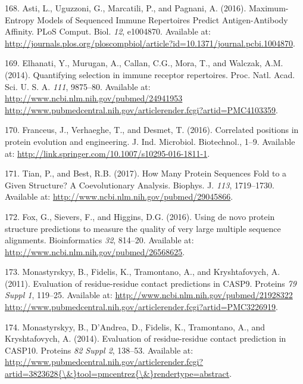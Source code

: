 \documentclass[11pt,a4paper,twoside]{book}
\theoremstyle{definition}
\theoremstyle{definition}
\theoremstyle{remark}
\begin{document}
\hypertarget{ref-Asti2016}{}
168. Asti, L., Uguzzoni, G., Marcatili, P., and Pagnani, A. (2016).
Maximum-Entropy Models of Sequenced Immune Repertoires Predict
Antigen-Antibody Affinity. PLoS Comput. Biol. \emph{12}, e1004870.
Available at:
\url{http://journals.plos.org/ploscompbiol/article?id=10.1371/journal.pcbi.1004870}.

\hypertarget{ref-Elhanati2014}{}
169. Elhanati, Y., Murugan, A., Callan, C.G., Mora, T., and Walczak,
A.M. (2014). Quantifying selection in immune receptor repertoires. Proc.
Natl. Acad. Sci. U. S. A. \emph{111}, 9875--80. Available at:
\href{http://www.ncbi.nlm.nih.gov/pubmed/24941953\%20http://www.pubmedcentral.nih.gov/articlerender.fcgi?artid=PMC4103359}{http://www.ncbi.nlm.nih.gov/pubmed/24941953 http://www.pubmedcentral.nih.gov/articlerender.fcgi?artid=PMC4103359}.

\hypertarget{ref-Franceus2016}{}
170. Franceus, J., Verhaeghe, T., and Desmet, T. (2016). Correlated
positions in protein evolution and engineering. J. Ind. Microbiol.
Biotechnol., 1--9. Available at:
\url{http://link.springer.com/10.1007/s10295-016-1811-1}.

\hypertarget{ref-Tian2017}{}
171. Tian, P., and Best, R.B. (2017). How Many Protein Sequences Fold to
a Given Structure? A Coevolutionary Analysis. Biophys. J. \emph{113},
1719--1730. Available at:
\url{http://www.ncbi.nlm.nih.gov/pubmed/29045866}.

\hypertarget{ref-Fox2016}{}
172. Fox, G., Sievers, F., and Higgins, D.G. (2016). Using de novo
protein structure predictions to measure the quality of very large
multiple sequence alignments. Bioinformatics \emph{32}, 814--20.
Available at: \url{http://www.ncbi.nlm.nih.gov/pubmed/26568625}.

\hypertarget{ref-Monastyrskyy2011}{}
173. Monastyrskyy, B., Fidelis, K., Tramontano, A., and Kryshtafovych,
A. (2011). Evaluation of residue-residue contact predictions in CASP9.
Proteins \emph{79 Suppl 1}, 119--25. Available at:
\href{http://www.ncbi.nlm.nih.gov/pubmed/21928322\%20http://www.pubmedcentral.nih.gov/articlerender.fcgi?artid=PMC3226919}{http://www.ncbi.nlm.nih.gov/pubmed/21928322 http://www.pubmedcentral.nih.gov/articlerender.fcgi?artid=PMC3226919}.

\hypertarget{ref-Monastyrskyy2014a}{}
174. Monastyrskyy, B., D'Andrea, D., Fidelis, K., Tramontano, A., and
Kryshtafovych, A. (2014). Evaluation of residue-residue contact
prediction in CASP10. Proteins \emph{82 Suppl 2}, 138--53. Available at:
\href{http://www.pubmedcentral.nih.gov/articlerender.fcgi?artid=3823628\%7B/\&\%7Dtool=pmcentrez\%7B/\&\%7Drendertype=abstract}{http://www.pubmedcentral.nih.gov/articlerender.fcgi?artid=3823628\{\textbackslash{}\&\}tool=pmcentrez\{\textbackslash{}\&\}rendertype=abstract}.
\end{document}
